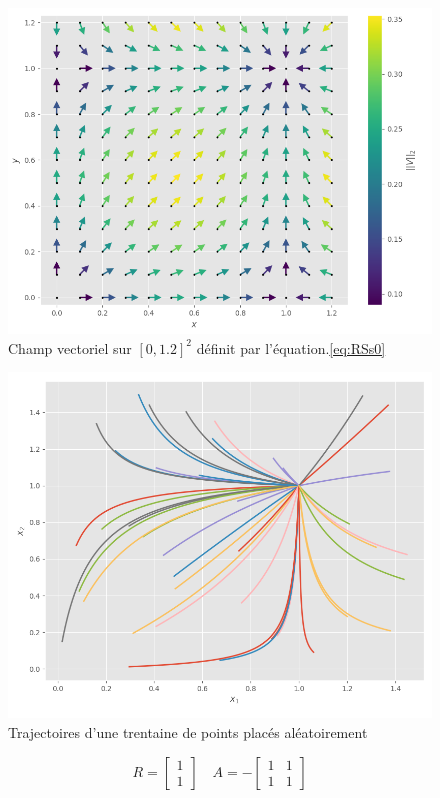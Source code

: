 \documentclass{wsdcr}
\begin{document}
\begin{figure}
    \centering
    \includegraphics[width=\linewidth]{fig/lv2_vfs0.png}
    \caption{Champ vectoriel sur $[0,1.2]^2$ définit par l'équation.\ref{eq:RSs0}}
    \label{fig:vfs0}
\end{figure}
\begin{figure}
    \centering
    \includegraphics[width=\linewidth]{fig/lv2_ts0.png}
    \caption{Trajectoires d'une trentaine de points placés aléatoirement}
    \label{fig:ts0}
\end{figure}
\begin{equation}
R={\begin{bmatrix}1\\1\end{bmatrix}}\quad A =-{\begin{bmatrix}1&1\\1&1\end{bmatrix}}
\label{eq:RSnInv}
\end{equation}
\end{document}
